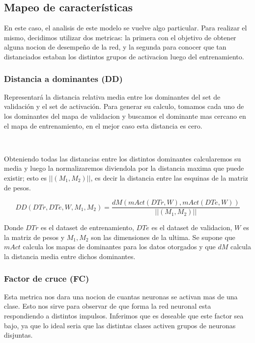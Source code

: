 \documentclass[informe.tex]{subfiles}
\begin{document}
      
      
    \subsection{Mapeo de características}
    
      En este caso, el analisis de este modelo se vuelve algo particular. Para realizar el mismo, decidimos utilizar dos metricas: la primera con el objetivo de obtener alguna nocion de desempe\~no de la red, y la segunda para conocer que tan distanciados estaban los distintos grupos de activacion luego del entrenamiento.
      
      \subsubsection{Distancia a dominantes (DD)}
      
      Representar\'a la distancia relativa media entre los dominantes del set de validaci\'on y el set de activaci\'on. Para generar su calculo, tomamos cada uno de los dominantes del mapa de validacion y buscamos el dominante mas cercano en el mapa de entrenamiento, en el mejor caso esta distancia es cero. 
      
      ~
      
      Obteniendo todas las distancias entre los distintos dominantes calcularemos su media y luego la normalizaremos diviendola por la distancia maxima que puede existir; esto es $||(M_1,M_2)||$, es decir la distancia entre las esquinas de la matriz de pesos.
      
      $$DD(DTr, DTe, W, M_1, M_2) = \frac{dM(mAct(DTr,W), mAct(DTe,W))}{||(M_1,M_2)||}$$
      
      Donde $DTr$ es el dataset de entrenamiento, $DTe$ es el dataset de validacion, $W$ es la matriz de pesos y $M_1, M_2$  son las dimensiones de la ultima. Se supone que $mAct$ calcula los mapas de dominantes para los datos otorgados y que $dM$ calcula la distancia media entre dichos dominantes.
      
      \subsubsection{Factor de cruce (FC)}
      
      Esta metrica nos dara una nocion de cuantas neuronas se activan mas de una clase. Esto nos sirve para observar de que forma la red neuronal esta respondiendo a distintos impulsos. Inferimos que es deseable que este factor sea bajo, ya que lo ideal seria que las distintas clases activen grupos de neuronas disjuntas.
      
\end{document}
